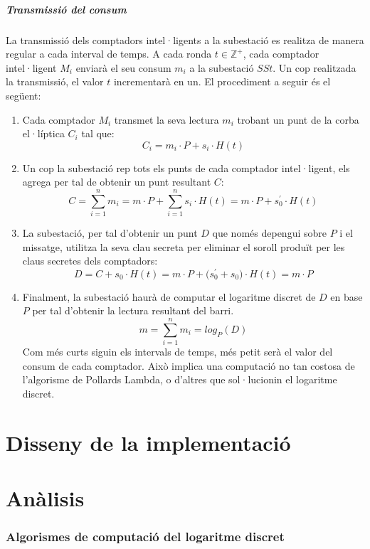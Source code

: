\documentclass{article}
\begin{document}
\subsubsection{Transmissió del consum}\label{section:ct}
La transmissió dels comptadors intel·ligents a la subestació es realitza de manera regular a cada interval de temps. A cada ronda $t \in \mathbb{Z^+}$, cada comptador intel·ligent $M_i$ enviarà el seu consum $m_i$ a la subestació $SSt$. Un cop realitzada la transmissió, el valor $t$ incrementarà en un. El procediment a seguir és el següent:
\begin{enumerate}
	\item Cada comptador $M_i$ transmet la seva lectura $m_i$ trobant un punt de la corba el·líptica $C_i$ tal que:
	\[C_i = m_i \cdot P + s_i \cdot H(t)\]
	\item Un cop la subestació rep tots els punts de cada comptador intel·ligent, els agrega per tal de obtenir un punt resultant $C$:
	\[C = \sum_{i=1}^{n}m_i = m \cdot P + \sum_{i=1}^{n}s_i \cdot H(t) = m \cdot P + s_0^{'}\cdot H(t)\]
	\item La subestació, per tal d'obtenir un punt $D$ que només depengui sobre $P$ i el missatge, utilitza la seva clau secreta per eliminar el soroll produït per les claus secretes dels comptadors:
	\[D = C + s_0 \cdot H(t) = m \cdot P + \big( s_0^{'} + s_0 \big) \cdot H(t) = m \cdot P\]
	\item Finalment, la subestació haurà de computar el logaritme discret de $D$ en base $P$ per tal d'obtenir la lectura resultant del barri.
	\[m = \sum_{i=1}^{n} m_i = log_P(D)\]
	Com més curts siguin els intervals de temps, més petit serà el valor del consum de cada comptador. Això implica una computació no tan costosa de l'algorisme de Pollards Lambda, o d'altres que sol·lucionin el logaritme discret.
\end{enumerate}

\newpage\part{Disseny de la implementació}\label{part:disseny}

\part{Anàlisis}\label{part:analisis}
\section{Algorismes de computació del logaritme discret}



\end{document}
